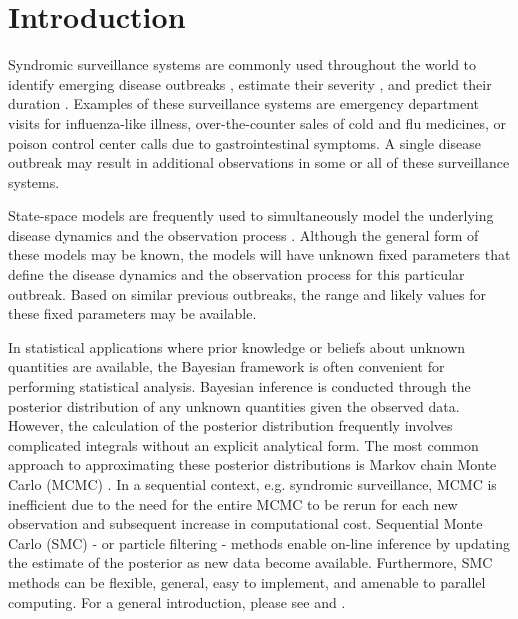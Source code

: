 \documentclass{elsarticle}
\begin{document}
\section{Introduction} \label{sec:intro}

Syndromic surveillance systems \citep{henning2004overview, wagner2006biosurveillance, wilson2006synsurveillance, hakenewerth2009north, Gins:Mohe:Pate:Bram:Smol:Bril:dete:2009} are commonly used throughout the world to identify emerging disease outbreaks \citep{neill2006bayesian}, estimate their severity \citep{merl2009statistical}, and predict their duration \cite{ludkovski2010optimal}. Examples of these surveillance systems are emergency department visits for influenza-like illness, over-the-counter sales of cold and flu medicines, or poison control center calls due to gastrointestinal symptoms. A single disease outbreak may result in additional observations in some or all of these surveillance systems.

State-space models are frequently used to simultaneously model the underlying disease dynamics and the observation process \citep{Mart:Cone:Lope:Lope:baye:2008,merl2009statistical,ludkovski2010optimal,skvortsov2012monitoring,unkel2012statistical}. Although the general form of these models may be known, the models will have unknown fixed parameters that define the disease dynamics and the observation process for this particular outbreak. Based on similar previous outbreaks, the range and likely values for these fixed parameters may be available.

In statistical applications where prior knowledge or beliefs about unknown quantities are available, the Bayesian framework is often convenient for performing statistical analysis.  Bayesian inference is conducted through the posterior distribution of any unknown quantities given the observed data. However, the calculation of the posterior distribution frequently involves complicated integrals without an explicit analytical form. The most common approach to approximating these posterior distributions is Markov chain Monte Carlo (MCMC) \citep{Gelf:Smit:samp:1990}. In a sequential context, e.g. syndromic surveillance, MCMC is inefficient due to the need for the entire MCMC to be rerun for each new observation and subsequent increase in computational cost. Sequential Monte Carlo (SMC) - or particle filtering - methods enable on-line inference by updating the estimate of the posterior as new data become available. Furthermore, SMC methods can be flexible, general, easy to implement, and amenable to parallel computing. For a general introduction, please see \cite{Douc:deFr:Gord:sequ:2001} and \cite{cappe2007overview}.
\end{document}

